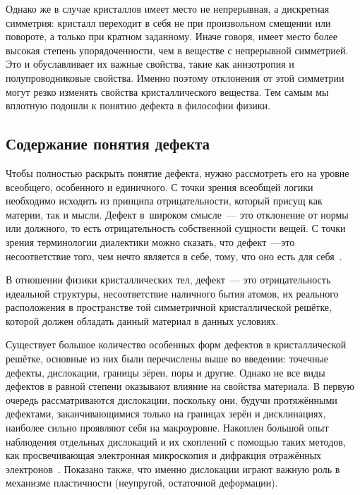 \documentclass[a4paper, 14pt, titlepage]{extarticle}
\begin{document}
  Однако же в случае кристаллов имеет место не непрерывная, а дискретная симметрия: кристалл
  переходит в себя не при произвольном смещении или повороте, а только при кратном заданному.
  Иначе говоря, имеет место более высокая степень упорядоченности, чем в веществе с непрерывной
  симметрией. Это и обуславливает их важные свойства, такие как анизотропия и полупроводниковые
  свойства. Именно поэтому отклонения от этой симметрии могут резко изменять свойства
  кристаллического вещества. Тем самым мы вплотную подошли к понятию дефекта в философии физики.


  \subsection{Содержание понятия дефекта}

  Чтобы полностью раскрыть понятие дефекта, нужно рассмотреть его на уровне всеобщего, особенного и
  единичного. С точки зрения всеобщей логики необходимо исходить из принципа отрицательности,
  который присущ как материи, так и мысли. Дефект в~широком смысле~--- это отклонение от нормы или
  должного, то есть отрицательность собственной сущности вещей. С точки зрения терминологии
  диалектики можно сказать, что дефект~---это несоответствие того, чем нечто является в себе, тому,
  что оно есть для себя~\cite{hegel-logic}.


  В отношении физики кристаллических тел, дефект~--- это отрицательность идеальной структуры,
  несоответствие наличного бытия атомов, их реального расположения в пространстве той симметричной
  кристаллической решётке, которой должен обладать данный материал в данных условиях.

  Существует большое количество особенных форм дефектов в кристаллической решётке, основные из
  них были перечислены выше во введении: точечные дефекты, дислокации, границы зёрен, поры и другие.
  Однако не все виды дефектов в равной степени оказывают влияние на свойства материала. В первую очередь
  рассматриваются дислокации, поскольку они, будучи протяжёнными дефектами, заканчивающимися только
  на границах зерён и дисклинациях, наиболее сильно проявляют себя на макроуровне. Накоплен большой
  опыт наблюдения отдельных дислокаций и их скоплений с помощью таких методов, как просвечивающая
  электронная микроскопия и дифракция отражённых электронов~\cite{hasebe-ftmp}. Показано также, что
  именно дислокации играют важную роль в механизме пластичности (неупругой, остаточной деформации).
\end{document}
